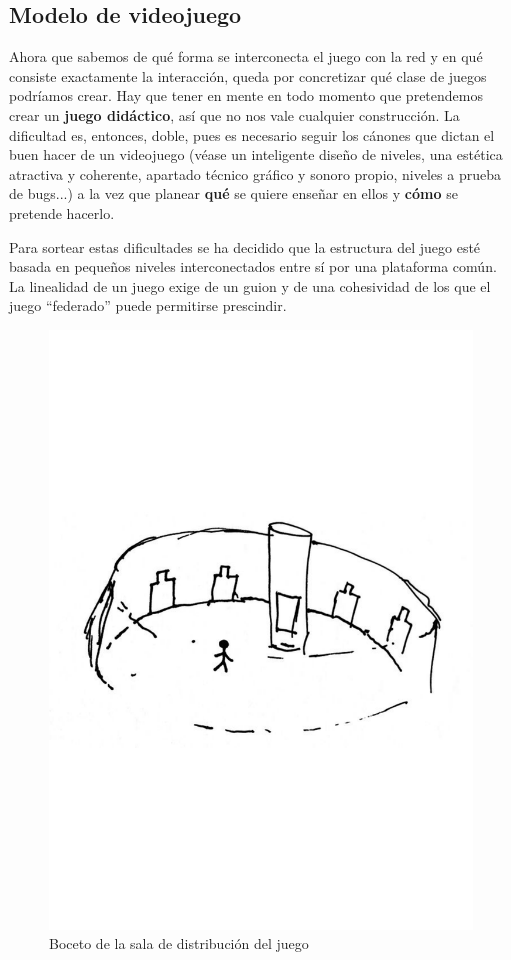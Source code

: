 \subsection{Modelo de videojuego}\label{subsec:modelojuego}
Ahora que sabemos de qué forma se interconecta el juego con la red y en qué consiste exactamente la interacción, queda por concretizar qué clase de juegos podríamos crear. Hay que tener en mente en todo momento que pretendemos crear un \textbf{juego didáctico}, así que no nos vale cualquier construcción. La dificultad es, entonces, doble, pues es necesario seguir los cánones que dictan el buen hacer de un videojuego (véase un inteligente diseño de niveles, una estética atractiva y coherente, apartado técnico gráfico y sonoro propio, niveles a prueba de bugs...) a la vez que planear \textbf{qué} se quiere enseñar en ellos y \textbf{cómo} se pretende hacerlo.

Para sortear estas dificultades se ha decidido que la estructura del juego esté basada en pequeños niveles interconectados entre sí por una plataforma común. La linealidad de un juego exige de un guion y de una cohesividad de los que el juego ``federado'' puede permitirse  prescindir.

\begin{figure}[H]
  \centering
  \includegraphics[scale=0.35, trim={0 9cm 0 9cm}]{imagenes/hall_juego}
  \caption{Boceto de la sala de distribución del juego}
  \label{fig:hall}
\end{figure}

